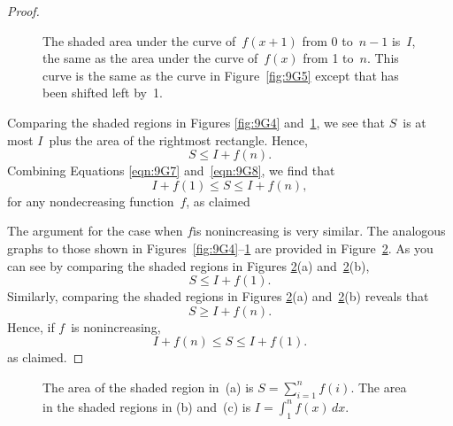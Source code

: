 \begin{proof}
\begin{figure}



\caption{The shaded area under the curve of~$f(x + 1)$ from 0 to~$n -
  1$ is~$I$, the same as the area under the curve of~$f(x)$ from 1
  to~$n$.  This curve is the same as the curve in Figure~\ref{fig:9G5}
  except that has been shifted left by~1.}

\label{fig:9G6}

\end{figure}

Comparing the shaded regions in Figures \ref{fig:9G4}
and~\ref{fig:9G6}, we see that $S$~is at most $I$~plus the area of the
rightmost rectangle.  Hence,
\begin{equation}\label{eqn:9G8}
    S \le I + f(n).
\end{equation}
Combining Equations \ref{eqn:9G7} and~\ref{eqn:9G8}, we find that
\begin{equation*}
    I + f(1) \le S \le I + f(n),
\end{equation*}
for any nondecreasing function~$f$, as claimed

The argument for the case when $f$is nonincreasing is very similar.
The analogous graphs to those shown in
Figures~\ref{fig:9G4}--\ref{fig:9G6} are provided in
Figure~\ref{fig:9G9}.  As you can see by comparing the shaded regions
in Figures \ref{fig:9G9}(a) and~\ref{fig:9G9}(b),
\begin{equation*}
    S \le I + f(1).
\end{equation*}
Similarly, comparing the shaded regions in Figures \ref{fig:9G9}(a)
and~\ref{fig:9G9}(b) reveals that
\begin{equation*}
    S \ge I + f(n).
\end{equation*}
Hence, if $f$~is nonincreasing,
\begin{equation*}
    I + f(n) \le S \le I + f(1).
\end{equation*}
as claimed.
\end{proof}

\begin{figure}



\caption{The area of the shaded region in~(a) is $S = \sum_{i = 1}^n
  f(i)$.  The area in the shaded regions in (b) and~(c) is $I =
  \int_1^n f(x)\,dx$.}

\label{fig:9G9}

\end{figure}

